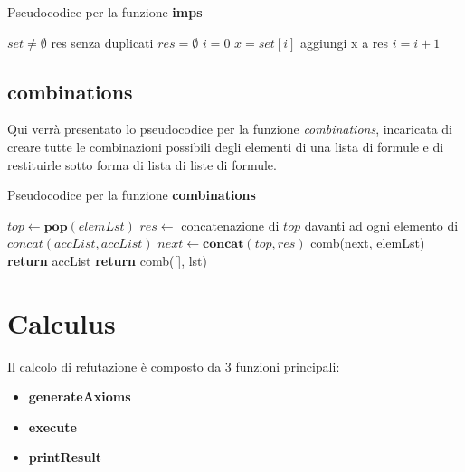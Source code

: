 \documentclass[\main/tesi.tex]{subfiles}
\begin{document}
\begin{algorithm}
    \caption{Pseudocodice per la funzione \textbf{imps}}\label{alg:imps}
    \begin{algorithmic}
        \Require $set \neq \emptyset$
        \Ensure res senza duplicati
        \State $res = \emptyset$
        \State $i = 0$
        \State $x = set[i]$
        aggiungi x a res
        \State $i = i + 1$
        \EndIf
        \EndWhile
    \end{algorithmic}
\end{algorithm}

\subsection{combinations}
Qui verrà presentato lo pseudocodice per la funzione \textit{combinations}, incaricata di creare tutte le combinazioni possibili degli elementi di una lista di formule e di restituirle sotto forma di lista di liste di formule. \\

\begin{algorithm}
    \caption{Pseudocodice per la funzione \textbf{combinations}}\label{alg:combinations}
    \begin{algorithmic}
        \Repeat
        \State $top \gets \textbf{pop}(elemLst)$
        \State $res \gets $ concatenazione di $top$ davanti ad ogni elemento di $concat(accList, accList)$
        \State $next \gets \textbf{concat}(top, res)$
        \State comb(next, elemLst)
        \State \textbf{return} accList
        \EndFunction
        \State \textbf{return} comb([], lst)
        \EndFunction
    \end{algorithmic}
\end{algorithm}

\section{Calculus}
Il calcolo di refutazione è composto da 3 funzioni principali:
\begin{itemize}
    \item \textbf{generateAxioms}
    \item \textbf{execute}
    \item \textbf{printResult}
\end{itemize}
\end{document}
